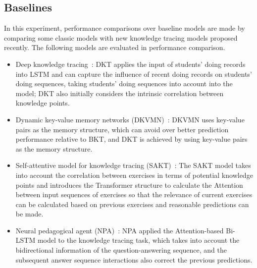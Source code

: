 \subsection{Baselines}
In this experiment, performance comparisons over baseline models are made by comparing some classic models with new knowledge tracing models proposed recently. The following models are evaluated in performance comparison.
\begin{itemize}
    \item Deep knowledge tracing~\cite{piech2015deep}: DKT applies the input of students' doing records into LSTM and can capture the influence of recent doing records on students' doing sequences, taking students' doing sequences into account into the model; DKT also initially considers the intrinsic correlation between knowledge points.
    \item Dynamic key-value memory networks (DKVMN)~\cite{zhang2017dynamic}: DKVMN uses key-value pairs as the memory structure, which can avoid over better prediction performance relative to BKT, and DKT is achieved by using key-value pairs as the memory structure.
    \item Self-attentive model for knowledge tracing (SAKT)~\cite{sakt2019}: The SAKT model takes into account the correlation between exercises in terms of potential knowledge points and introduces the Transformer structure to calculate the Attention between input sequences of exercises so that the relevance of current exercises can be calculated based on previous exercises and reasonable predictions can be made.
    \item Neural pedagogical agent (NPA)~\cite{Lee2019CreatingAN}: NPA applied the Attention-based Bi-LSTM model to the knowledge tracing task, which takes into account the bidirectional information of the question-answering sequence, and the subsequent answer sequence interactions also correct the previous predictions.
\end{itemize}


